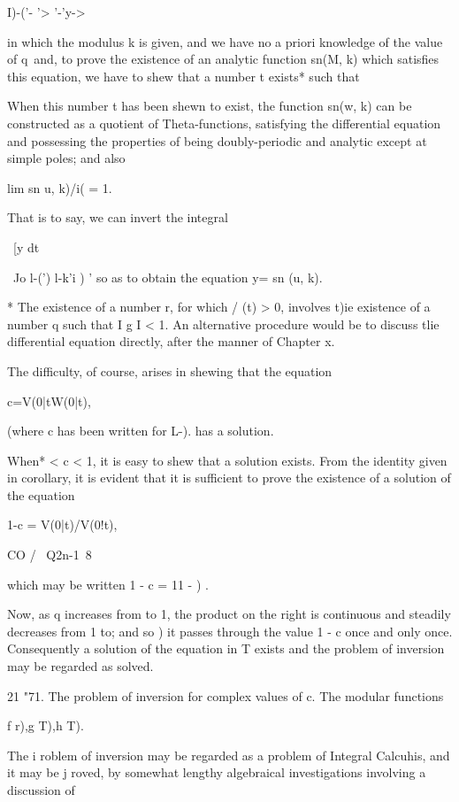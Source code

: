  I)-('- '> '-'y->

in which the modulus k is given, and we have no a priori knowledge of
the value of q\ and, to prove the existence of an analytic function
sn(M, k) which satisfies this equation, we have to shew that a number
t exists* such that

When this number t has been shewn to exist, the function sn(w, k) can
be constructed as a quotient of Theta-functions, satisfying the
differential equation and possessing the properties of being
doubly-periodic and analytic except at simple poles; and also

lim sn u, k)/i( = 1.

That is to say, we can invert the integral

\ [y dt

 ~Jo l-(') l-k'i ) ' so as to obtain the equation y= sn (u, k).

* The existence of a number r, for which / (t) > 0, involves t)ie
existence of a number q such that I g I < 1. An alternative procedure
would be to discuss tlie differential equation directly, after the
manner of Chapter x.

%
%

The difficulty, of course, arises in shewing that the equation

c=V(0|tW(0|t),

(where c has been written for L-). has a solution.

When* < c < 1, it is easy to shew that a solution exists. From the
identity given in  corollary, it is evident that it is sufficient
to prove the existence of a solution of the equation

1-c = V(0|t)/V(0!t),

CO / \ Q2n-1\ 8

which may be written 1 - c = 11 - ) .

Now, as q increases from to 1, the product on the right is continuous
and steadily decreases from 1 to; and so ) it passes through
the value 1 - c once and only once. Consequently a solution of the
equation in T exists and the problem of inversion may be regarded as
solved.

21 "71. The problem of inversion for complex values of c. The modular
functions

f r),g T),h T).

The i roblem of inversion may be regarded as a problem of Integral
Calcuhis, and it may be j roved, by somewhat lengthy algebraical
investigations involving a discussion of

